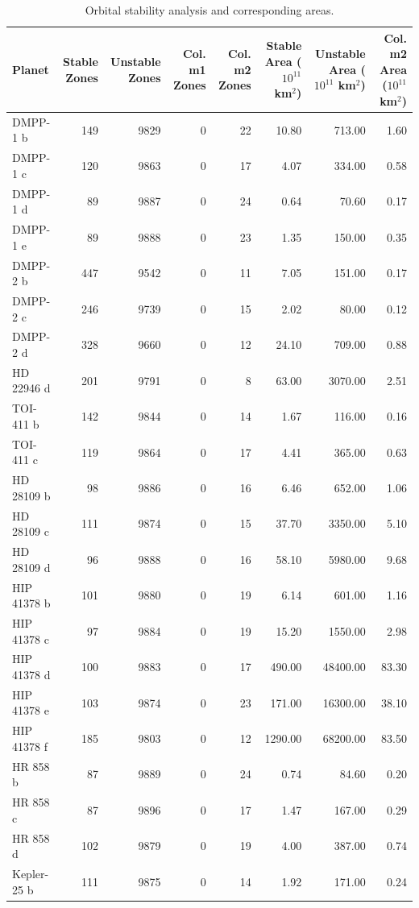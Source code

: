 \begin{table}
\caption{Orbital stability analysis and corresponding areas.}
\label{tab:stability_areas}
\begin{tabular}{lrrrrrrr}
\toprule
Planet & Stable Zones & Unstable Zones & Col. m1 Zones & Col. m2 Zones & Stable Area ($10^{11}$ km$^2$) & Unstable Area ($10^{11}$ km$^2$) & Col. m2 Area ($10^{11}$ km$^2$) \\
\midrule
DMPP-1 b & 149 & 9829 & 0 & 22 & 10.80 & 713.00 & 1.60 \\
DMPP-1 c & 120 & 9863 & 0 & 17 & 4.07 & 334.00 & 0.58 \\
DMPP-1 d & 89 & 9887 & 0 & 24 & 0.64 & 70.60 & 0.17 \\
DMPP-1 e & 89 & 9888 & 0 & 23 & 1.35 & 150.00 & 0.35 \\
DMPP-2 b & 447 & 9542 & 0 & 11 & 7.05 & 151.00 & 0.17 \\
DMPP-2 c & 246 & 9739 & 0 & 15 & 2.02 & 80.00 & 0.12 \\
DMPP-2 d & 328 & 9660 & 0 & 12 & 24.10 & 709.00 & 0.88 \\
HD 22946 d & 201 & 9791 & 0 & 8 & 63.00 & 3070.00 & 2.51 \\
TOI-411 b & 142 & 9844 & 0 & 14 & 1.67 & 116.00 & 0.16 \\
TOI-411 c & 119 & 9864 & 0 & 17 & 4.41 & 365.00 & 0.63 \\
HD 28109 b & 98 & 9886 & 0 & 16 & 6.46 & 652.00 & 1.06 \\
HD 28109 c & 111 & 9874 & 0 & 15 & 37.70 & 3350.00 & 5.10 \\
HD 28109 d & 96 & 9888 & 0 & 16 & 58.10 & 5980.00 & 9.68 \\
HIP 41378 b & 101 & 9880 & 0 & 19 & 6.14 & 601.00 & 1.16 \\
HIP 41378 c & 97 & 9884 & 0 & 19 & 15.20 & 1550.00 & 2.98 \\
HIP 41378 d & 100 & 9883 & 0 & 17 & 490.00 & 48400.00 & 83.30 \\
HIP 41378 e & 103 & 9874 & 0 & 23 & 171.00 & 16300.00 & 38.10 \\
HIP 41378 f & 185 & 9803 & 0 & 12 & 1290.00 & 68200.00 & 83.50 \\
HR 858 b & 87 & 9889 & 0 & 24 & 0.74 & 84.60 & 0.20 \\
HR 858 c & 87 & 9896 & 0 & 17 & 1.47 & 167.00 & 0.29 \\
HR 858 d & 102 & 9879 & 0 & 19 & 4.00 & 387.00 & 0.74 \\
Kepler-25 b & 111 & 9875 & 0 & 14 & 1.92 & 171.00 & 0.24 \\

\end{tabular}
\end{table}
